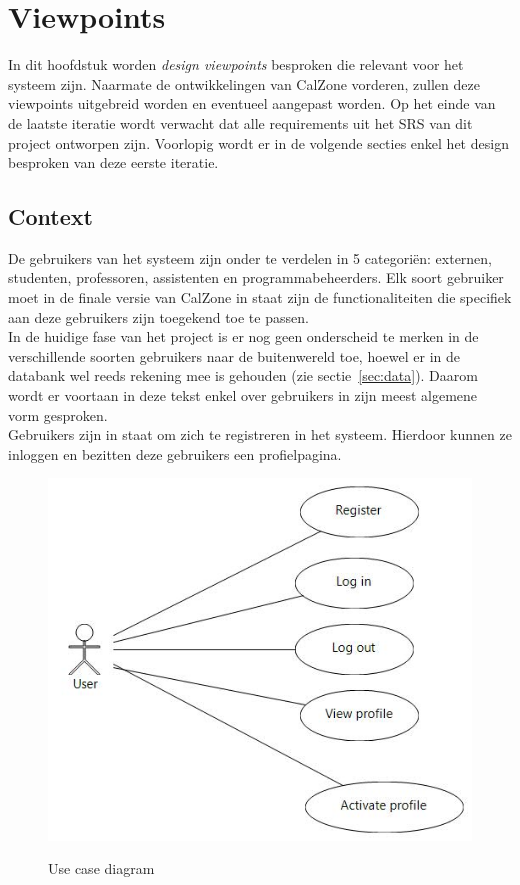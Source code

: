 \chapter{Viewpoints}
\label{chap:viewpoints}

In dit hoofdstuk worden \emph{design viewpoints} besproken die relevant voor het systeem zijn. 
Naarmate de ontwikkelingen van CalZone vorderen, zullen deze viewpoints uitgebreid worden en eventueel aangepast worden. 
Op het einde van de laatste iteratie wordt verwacht dat alle requirements uit het SRS van dit project ontworpen zijn. 
Voorlopig wordt er in de volgende secties enkel het design besproken van deze eerste iteratie.

\section{Context}
\label{sec:context}

De gebruikers van het systeem zijn onder te verdelen in 5 categori\"{e}n: externen, studenten, professoren, assistenten en programmabeheerders. 
Elk soort gebruiker moet in de finale versie van CalZone in staat zijn de functionaliteiten die specifiek aan deze gebruikers zijn toegekend toe te passen. 
\\
In de huidige fase van het project is er nog geen onderscheid te merken in de verschillende soorten gebruikers naar de buitenwereld toe, hoewel er in de databank wel reeds rekening mee is gehouden (zie sectie~\ref{sec:data}). 
Daarom wordt er voortaan in deze tekst enkel over gebruikers in zijn meest algemene vorm gesproken.
\\
Gebruikers zijn in staat om zich te registreren in het systeem. 
Hierdoor kunnen ze inloggen en bezitten deze gebruikers een profielpagina. 

\begin{figure}[H]
	\centering
	\includegraphics[scale=0.5]{design/papyrus/use_cases.jpg}
	\label{fig:usecase}
	\caption{Use case diagram}
\end{figure}

